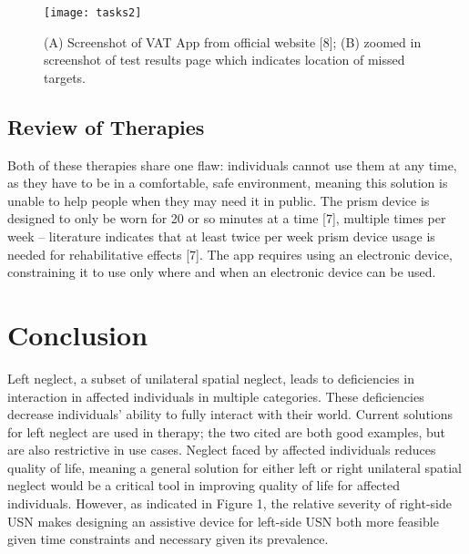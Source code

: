 \begin{figure}[h]
  \centering
  \texttt{[image: tasks2]}
  \caption[VAT App.]{(A) Screenshot of VAT App from official website [8]; (B)
    zoomed in screenshot of test results page which indicates location of
    missed targets.}
  \label{fig:tasks2}
\end{figure}

\subsection{Review of Therapies}

Both of these therapies share one flaw: individuals cannot use them at any
time, as they have to be in a comfortable, safe environment, meaning this
solution is unable to help people when they may need it in public. The prism
device is designed to only be worn for 20 or so minutes at a time [7], multiple
times per week – literature indicates that at least twice per week prism device
usage is needed for rehabilitative effects [7]. The app requires using an
electronic device, constraining it to use only where and when an electronic
device can be used.

\section{Conclusion}
Left neglect, a subset of unilateral spatial neglect, leads to deficiencies in
interaction in affected individuals in multiple categories. These deficiencies
decrease individuals’ ability to fully interact with their world. Current
solutions for left neglect are used in therapy; the two cited are both good
examples, but are also restrictive in use cases. Neglect faced by affected
individuals reduces quality of life, meaning a general solution for either left
or right unilateral spatial neglect would be a critical tool in improving
quality of life for affected individuals. However, as indicated in Figure 1,
the relative severity of right-side USN makes designing an assistive device for
left-side USN both more feasible given time constraints and necessary given its
prevalence.

